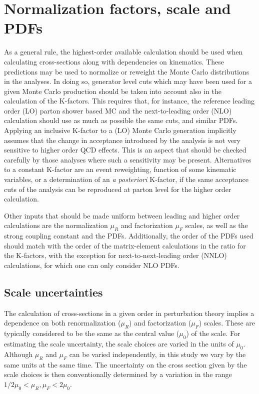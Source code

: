 \section{Normalization factors, scale and PDFs}
\label{sec:normalization}
As a general rule, the highest-order available calculation should be used when 
calculating cross-sections along with dependencies on kinematics. These predictions
may be used to normalize or reweight the Monte Carlo distributions in the analyses.
In doing so, generator level cuts which may have been used for a given Monte Carlo 
production should be taken into account also in the calculation of the K-factors. 
This requires that, for instance, the 
reference leading order (LO) parton shower based MC and the next-to-leading order 
(NLO) calculation should use as much as possible the same cuts, and similar PDFs. 
Applying an inclusive K-factor to a (LO) Monte Carlo generation implicitly assumes
that the change in acceptance introduced by the analysis is not very sensitive 
to higher order QCD effects. This is an aspect that should be checked carefully
by those analyses where such a sensitivity may be present. Alternatives to a
constant K-factor are an event reweighting, function of some kinematic variables, 
or a determination of an {\it a posteriori} K-factor, if the same acceptance cuts 
of the analysis can be reproduced at parton level for the higher order calculation.

Other inputs that should be made uniform between leading and higher order 
calculations are the normalization $\mu_R$ and factorization $\mu_F$ scales,
as well as the strong coupling constant and the PDFs. 
Additionally, the order of the PDFs used should match with the order of the 
matrix-element calculations in the ratio for the K-factors, with the exception 
for next-to-next-leading order (NNLO) calculations, for which one can only 
consider NLO PDFs. 

\subsection{Scale uncertainties}
\label{kf}

The calculation of cross-sections in a given order in perturbation theory 
implies a dependence on both renormalization ($\mu_R$) and factorization 
($\mu_F$) scales. These are typically considered to be the same as the central 
value ($\mu_0$) of the scale.  For estimating the scale uncertainty, the scale 
choices are varied in the units of $\mu_0$. Although $\mu_R$ and $\mu_F$ can 
be varied independently, in this study we vary by the same units at the same 
time. The uncertainty on the cross section given by the scale choices is
then conventionally determined by a variation in the range
$1/2 \mu_0 < \mu_R, \mu_F < 2\mu_0$. 

